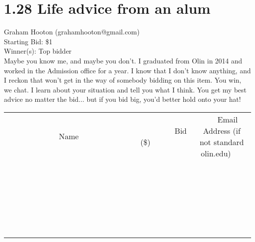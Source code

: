 \documentclass[11pt]{article}
\begin{document}
\section*{1.28 Life advice from an alum}
Graham Hooton (grahamhooton@gmail.com) \\
Starting Bid: \$1 \\
Winner(s): 
Top bidder \\
Maybe you know me, and maybe you don't. I graduated from Olin in 2014 and worked in the Admission office for a year. I know that I don't know anything, and I reckon that won't get in the way of somebody bidding on this item.
You win, we chat. I learn about your situation and tell you what I think. You get my best advice no matter the bid... but if you bid big, you'd better hold onto your hat! \\[6ex]
\begin{tabular}{c c c}
~~~~~~~~~~~~~Name~~~~~~~~~~~~~ & ~~~~~~~~~Bid (\$)~~~~~~~~~ & ~~~Email Address (if not standard olin.edu)~~~ \\
 & & \\
\hline
 & & \\
\hline
 & & \\
\hline
 & & \\
\hline
 & & \\
\hline
 & & \\
\hline
 & & \\
\hline
 & & \\
\hline
 & & \\
\hline
 & & \\
\hline
 & & \\
\hline
 & & \\
\hline
 & & \\
\hline
 & & \\
\hline
 & & \\
\hline
 & & \\
\hline
 & & \\
\hline
 & & \\
\hline
 & & \\
\hline
 & & \\
\hline
 & & \\
\hline
 & & \\
\hline
 & & \\
\hline
 & & \\
\hline
 & & \\
\hline
 & & \\
\hline
\end{tabular}
\clearpage
\end{document}
